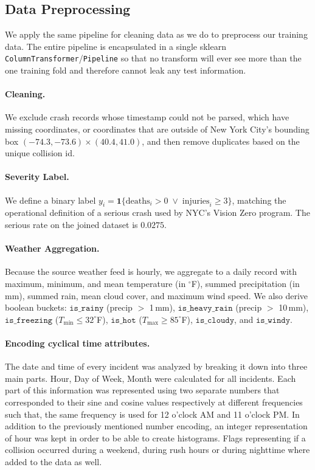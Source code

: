 \documentclass{article}
\begin{document}
\subsection{Data Preprocessing}
\label{sec:preproc}
We apply the same pipeline for cleaning data as we do to preprocess our
training data. The entire pipeline is encapsulated in a single sklearn
\texttt{ColumnTransformer}/\texttt{Pipeline} so that no transform will ever
see more than the one training fold and therefore cannot leak any test
information.

\paragraph{Cleaning.} We exclude crash records whose timestamp could not be
parsed, which have missing coordinates, or coordinates that are outside of
New York City's bounding box $(-74.3, -73.6) \times (40.4, 41.0)$, and then
remove duplicates based on the unique collision id.
\paragraph{Severity Label.} We define a binary label
$y_i = \mathbf{1}\{\text{deaths}_i > 0 \;\lor\; \text{injuries}_i \geq 3\}$,
matching the operational definition of a serious crash used by NYC's Vision
Zero program. The serious rate on the joined dataset is $0.0275$.
\paragraph{Weather Aggregation.} Because the source weather feed is hourly,
we aggregate to a daily record with maximum, minimum, and mean temperature
(in $^\circ$F), summed precipitation (in mm), summed rain, mean cloud cover,
and maximum wind speed. We also derive boolean buckets:
$\texttt{is\_rainy}$ (precip $>$ 1\,mm), $\texttt{is\_heavy\_rain}$
(precip $>$ 10\,mm), $\texttt{is\_freezing}$ ($T_{\min} \leq 32^\circ$F),
$\texttt{is\_hot}$ ($T_{\max} \geq 85^\circ$F), $\texttt{is\_cloudy}$, and
$\texttt{is\_windy}$.
\paragraph{Encoding cyclical time attributes.} The date and time of every
incident was analyzed by breaking it down into three main parts. Hour, Day
of Week, Month were calculated for all incidents. Each part of this
information was represented using two separate numbers that corresponded to
their sine and cosine values respectively at different frequencies such
that, the same frequency is used for 12 o'clock AM and 11 o'clock PM. In
addition to the previously mentioned number encoding, an integer
representation of hour was kept in order to be able to create histograms.
Flags representing if a collision occurred during a weekend, during rush
hours or during nighttime where added to the data as well.
\end{document}
